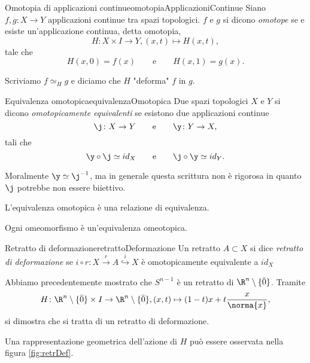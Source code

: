 \begin{defn}{Omotopia di applicazioni continue}{omotopiaApplicazioniContinue}
	Siano \(f,g\colon X \to Y\) applicazioni continue tra spazi topologici.
	\(f\) e \(g\) si dicono \emph{omotope} se e esiste un'applicazione continua, detta omotopia,
	\[
		H\colon X \times I \to Y, (x,t) \mapsto H(x,t),
	\]
	tale che
	\[
		H(x,0) = f(x) \qquad\text{e}\qquad H(x,1) = g(x).
	\]
\end{defn}

\begin{notz}
	Scriviamo \(f \simeq_H g\) e diciamo che \(H\) "deforma" \(f\) in \(g\).
\end{notz}

\begin{defn}{Equivalenza omotopica}{equivalenzaOmotopica}
	Due spazi topologici \(X\) e \(Y\) si dicono \emph{omotopicamente equivalenti} se  esistono due applicazioni continue
	\[
		\j \colon X \to Y \qquad\text{e}\qquad \y \colon Y \to X,
	\]
	tali che
	\[
		\y \circ \j \simeq id_X \qquad\text{e}\qquad \j\circ \y \simeq id_Y.
	\]
\end{defn}

\begin{oss}
	Moralmente \(\y \simeq \j^{-1}\), ma in generale questa scrittura non è rigorosa in quanto \(\j\) potrebbe non essere biiettivo.
\end{oss}

\begin{oss}
	L'equivalenza omotopica è una relazione di equivalenza.
\end{oss}

\begin{pr}
	Ogni omeomorfismo è un'equivalenza omeotopica.
\end{pr}

\begin{defn}{Retratto di deformazione}{retrattoDeformazione}
	Un retratto \(A\subset X\) si dice \emph{retratto di deformazione} se \(i\circ r\colon X \xrightarrow{r} A \overset{i}{\hookrightarrow} X\) è omotopicamente equivalente a \(id_X\)
\end{defn}

\begin{ese}
	Abbiamo precedentemente mostrato che \(S^{n-1}\) è un retratto di \(\R^n\setminus\{\bar{0}\}\).
	Tramite
	\[
		H\colon \R^n\setminus\{\bar{0}\} \times I \to \R^n\setminus\{\bar{0}\}, (x,t) \mapsto (1-t)x + t \frac{x}{\norma{x}},
	\]
	si dimostra che si tratta di un retratto di deformazione.

	Una rappresentazione geometrica dell'azione di \(H\) può essere osservata nella figura \ref{fig:retrDef}.
\end{ese}

